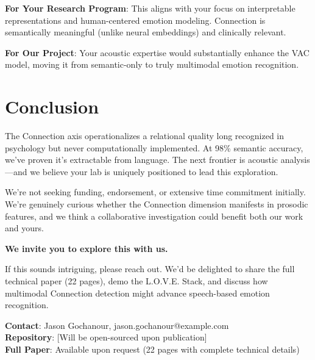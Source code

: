 \documentclass[11pt]{article}
\begin{document}
\textbf{For Your Research Program}: This aligns with your focus on interpretable representations and human-centered emotion modeling. Connection is semantically meaningful (unlike neural embeddings) and clinically relevant.

\textbf{For Our Project}: Your acoustic expertise would substantially enhance the VAC model, moving it from semantic-only to truly multimodal emotion recognition.

\section{Conclusion}

The Connection axis operationalizes a relational quality long recognized in psychology but never computationally implemented. At 98\% semantic accuracy, we've proven it's extractable from language. The next frontier is acoustic analysis—and we believe your lab is uniquely positioned to lead this exploration.

We're not seeking funding, endorsement, or extensive time commitment initially. We're genuinely curious whether the Connection dimension manifests in prosodic features, and we think a collaborative investigation could benefit both our work and yours.

\textbf{We invite you to explore this with us.}

If this sounds intriguing, please reach out. We'd be delighted to share the full technical paper (22 pages), demo the L.O.V.E. Stack, and discuss how multimodal Connection detection might advance speech-based emotion recognition.

\vspace{0.3cm}

\noindent
\textbf{Contact}: Jason Gochanour, jason.gochanour@example.com \\
\textbf{Repository}: [Will be open-sourced upon publication] \\
\textbf{Full Paper}: Available upon request (22 pages with complete technical details)
\end{document}

